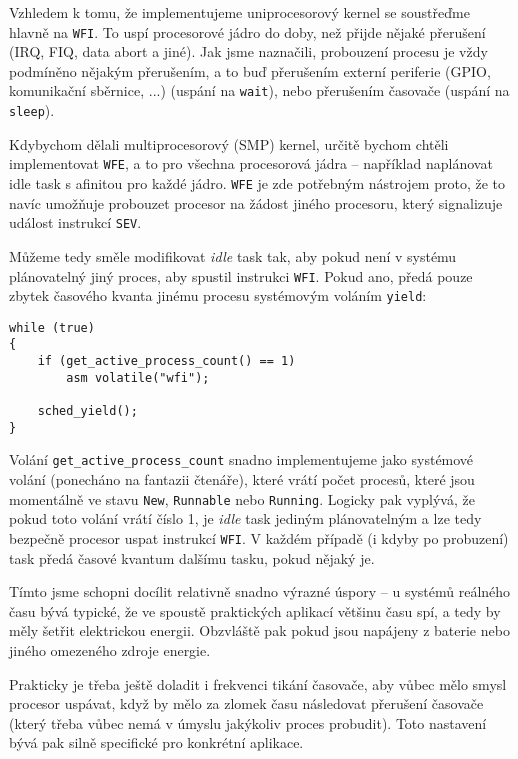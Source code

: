 \documentclass{article}
\begin{document}
Vzhledem k tomu, že implementujeme uniprocesorový kernel se soustřeďme hlavně na \texttt{WFI}. To uspí procesorové jádro do doby, než přijde nějaké přerušení (IRQ, FIQ, data abort a jiné). Jak jsme naznačili, probouzení procesu je vždy podmíněno nějakým přerušením, a to buď přerušením externí periferie (GPIO, komunikační sběrnice, ...) (uspání na \texttt{wait}), nebo přerušením časovače (uspání na \texttt{sleep}).

Kdybychom dělali multiprocesorový (SMP) kernel, určitě bychom chtěli implementovat \texttt{WFE}, a to pro všechna procesorová jádra -- například naplánovat idle task s afinitou pro každé jádro. \texttt{WFE} je zde potřebným nástrojem proto, že to navíc umožňuje probouzet procesor na žádost jiného procesoru, který signalizuje událost instrukcí \texttt{SEV}.

Můžeme tedy směle modifikovat \emph{idle} task tak, aby pokud není v systému plánovatelný jiný proces, aby spustil instrukci \texttt{WFI}. Pokud ano, předá pouze zbytek časového kvanta jinému procesu systémovým voláním \texttt{yield}:
\begin{lstlisting}
while (true)
{
	if (get_active_process_count() == 1)
		asm volatile("wfi");

	sched_yield();
}
\end{lstlisting}
Volání \texttt{get\_active\_process\_count} snadno implementujeme jako systémové volání (ponecháno na fantazii čtenáře), které vrátí počet procesů, které jsou momentálně ve stavu \texttt{New}, \texttt{Runnable} nebo \texttt{Running}. Logicky pak vyplývá, že pokud toto volání vrátí číslo 1, je \emph{idle} task jediným plánovatelným a lze tedy bezpečně procesor uspat instrukcí \texttt{WFI}. V každém případě (i kdyby po probuzení) task předá časové kvantum dalšímu tasku, pokud nějaký je.

Tímto jsme schopni docílit relativně snadno výrazné úspory -- u systémů reálného času bývá typické, že ve spoustě praktických aplikací většinu času spí, a tedy by měly šetřit elektrickou energii. Obzvláště pak pokud jsou napájeny z baterie nebo jiného omezeného zdroje energie.

Prakticky je třeba ještě doladit i frekvenci tikání časovače, aby vůbec mělo smysl procesor uspávat, když by mělo za zlomek času následovat přerušení časovače (který třeba vůbec nemá v úmyslu jakýkoliv proces probudit). Toto nastavení bývá pak silně specifické pro konkrétní aplikace.

\end{document}
